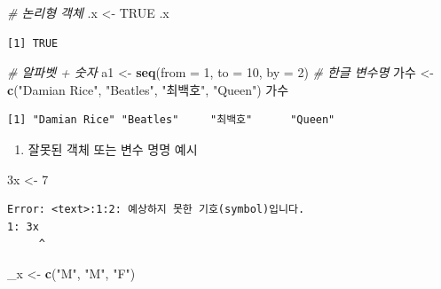 \documentclass[11pt,a4paper]{book}
\newenvironment{Shaded}{\begin{snugshade}}{\end{snugshade}}
\newcommand{\KeywordTok}[1]{\textcolor[rgb]{0.13,0.29,0.53}{\textbf{#1}}}
\newcommand{\DataTypeTok}[1]{\textcolor[rgb]{0.13,0.29,0.53}{#1}}
\newcommand{\DecValTok}[1]{\textcolor[rgb]{0.00,0.00,0.81}{#1}}
\newcommand{\StringTok}[1]{\textcolor[rgb]{0.31,0.60,0.02}{#1}}
\newcommand{\CommentTok}[1]{\textcolor[rgb]{0.56,0.35,0.01}{\textit{#1}}}
\newcommand{\OtherTok}[1]{\textcolor[rgb]{0.56,0.35,0.01}{#1}}
\newcommand{\NormalTok}[1]{#1}
\providecommand{\tightlist}{%
  \setlength{\itemsep}{0pt}\setlength{\parskip}{0pt}}
\theoremstyle{definition}
\theoremstyle{definition}
\theoremstyle{definition}
\theoremstyle{remark}
\begin{document}
\begin{Shaded}
\begin{Highlighting}[]
\CommentTok{# 논리형 객체}
\NormalTok{.x <-}\StringTok{ }\OtherTok{TRUE}
\NormalTok{.x}
\end{Highlighting}
\end{Shaded}

\begin{verbatim}
[1] TRUE
\end{verbatim}

\begin{Shaded}
\begin{Highlighting}[]
\CommentTok{# 알파벳 + 숫자}
\NormalTok{a1 <-}\StringTok{ }\KeywordTok{seq}\NormalTok{(}\DataTypeTok{from =} \DecValTok{1}\NormalTok{, }\DataTypeTok{to =} \DecValTok{10}\NormalTok{, }\DataTypeTok{by =} \DecValTok{2}\NormalTok{)}
\CommentTok{# 한글 변수명}
\NormalTok{가수 <-}\StringTok{ }\KeywordTok{c}\NormalTok{(}\StringTok{"Damian Rice"}\NormalTok{, }\StringTok{"Beatles"}\NormalTok{, }\StringTok{"최백호"}\NormalTok{, }\StringTok{"Queen"}\NormalTok{)}
\NormalTok{가수}
\end{Highlighting}
\end{Shaded}

\begin{verbatim}
[1] "Damian Rice" "Beatles"     "최백호"      "Queen"      
\end{verbatim}

\normalsize

\begin{enumerate}
\def\labelenumi{\arabic{enumi}.}
\setcounter{enumi}{2}
\tightlist
\item
  잘못된 객체 또는 변수 명명 예시
\end{enumerate}

\footnotesize

\begin{Shaded}
\begin{Highlighting}[]
\NormalTok{3x <-}\StringTok{ }\DecValTok{7}
\end{Highlighting}
\end{Shaded}

\begin{verbatim}
Error: <text>:1:2: 예상하지 못한 기호(symbol)입니다.
1: 3x
     ^
\end{verbatim}

\normalsize

\footnotesize

\begin{Shaded}
\begin{Highlighting}[]
\NormalTok{_x <-}\StringTok{ }\KeywordTok{c}\NormalTok{(}\StringTok{"M"}\NormalTok{, }\StringTok{"M"}\NormalTok{, }\StringTok{"F"}\NormalTok{)}
\end{Highlighting}
\end{Shaded}
\end{document}
